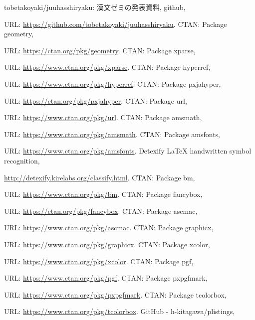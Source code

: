 \documentclass[uplatex]{jsreport}
\begin{document}
\begin{thebibliography}{99}
   tobetakoyaki/juuhasshiryaku: 漢文ゼミの発表資料, github,\par
  URL: \url{https://github.com/tobetakoyaki/juuhasshiryaku}.
   CTAN: Package geometry, \par
  URL: \url{https://ctan.org/pkg/geometry}.
   CTAN: Package xparse, \par
  URL: \url{https://www.ctan.org/pkg/xparse}.
   CTAN: Package hyperref, \par
  URL: \url{https://www.ctan.org/pkg/hyperref}.
   CTAN: Package pxjahyper, \par
  URL: \url{https://ctan.org/pkg/pxjahyper}.
   CTAN: Package url, \par
  URL: \url{https://www.ctan.org/pkg/url}.
   CTAN: Package amsmath, \par
  URL: \url{https://www.ctan.org/pkg/amsmath}.
   CTAN: Package amsfonts, \par
  URL: \url{https://www.ctan.org/pkg/amsfonts}.
   Detexify LaTeX handwritten symbol recognition, \par
  \url{http://detexify.kirelabs.org/classify.html}.
   CTAN: Package bm, \par
  URL: \url{https://www.ctan.org/pkg/bm}.
   CTAN: Package fancybox, \par
  URL: \url{https://ctan.org/pkg/fancybox}.
   CTAN: Package ascmac, \par
  URL: \url{https://www.ctan.org/pkg/ascmac}.
   CTAN: Package graphicx, \par
  URL: \url{https://www.ctan.org/pkg/graphicx}.
   CTAN: Package xcolor, \par
  URL: \url{https://www.ctan.org/pkg/xcolor}.
   CTAN: Package pgf, \par
  URL: \url{https://www.ctan.org/pkg/pgf}.
   CTAN: Package pxpgfmark, \par
  URL: \url{https://www.ctan.org/pkg/pxpgfmark}.
   CTAN: Package tcolorbox, \par
  URL: \url{https://www.ctan.org/pkg/tcolorbox}.
   GitHub - h-kitagawa/plistings, \par

\end{thebibliography}
\end{document}
